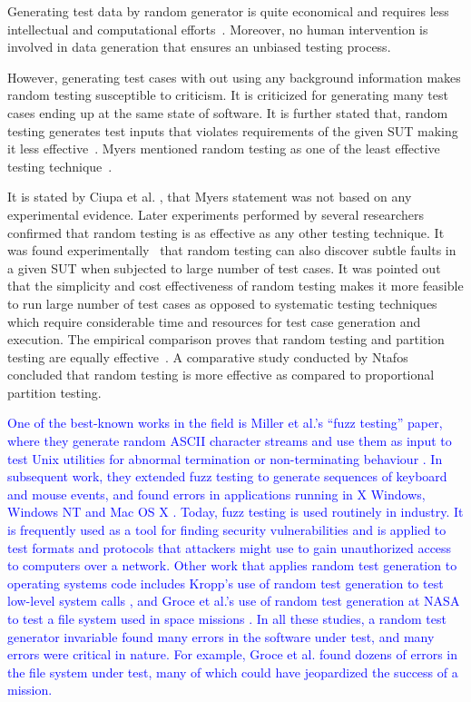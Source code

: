 Generating test data by random generator is quite economical and requires less intellectual and computational efforts~\cite{Ciupa2008a}. Moreover, no human intervention is involved in data generation that ensures an unbiased testing process.

However, generating test cases with out using any background information makes random testing susceptible to criticism. It is criticized for generating many test cases ending up at the same state of software. It is further stated that, random testing generates test inputs that violates requirements of the given SUT making it less effective~\cite{pacheco2009directed, sen2007effective}. Myers mentioned random testing as one of the least effective testing technique~\cite{Myers1979}.

It is stated by Ciupa et al. \cite{Ciupa2007}, that Myers statement was not based on any experimental evidence. Later experiments performed by several researchers~\cite{hamlet1994, Ciupa2008, leitner2007efficient, Duran1981} confirmed that random testing is as effective as any other testing technique. It was found experimentally~\cite{Duran1981} that random testing can also discover subtle faults in a given SUT when subjected to large number of test cases. It was pointed out that the simplicity and cost effectiveness of random testing makes it more feasible to run large number of test cases as opposed to systematic testing techniques which require considerable time and resources for test case generation and execution. The empirical comparison proves that random testing and partition testing are equally effective~\cite{hamlet1990}. A comparative study conducted by Ntafos~\cite{ntafos1998random} concluded that random testing is more effective as compared to proportional partition testing.

\textcolor{blue}{One of the best-known works in the field is Miller et al.’s “fuzz testing” paper, where they generate random ASCII character streams and use them as input to test Unix utilities for abnormal termination or non-terminating behaviour \cite{miller1990empirical}. In subsequent work, they extended fuzz testing to generate sequences of keyboard and mouse events, and found errors in applications running in X Windows, Windows NT and Mac OS X \cite{forrester2000empirical, miller2006empirical}. Today, fuzz testing is used routinely in industry. It is frequently used as a tool for finding security vulnerabilities and is applied to test formats and protocols that attackers might use to gain unauthorized access to computers over a network. Other work that applies random test generation to operating systems code includes Kropp’s use of random test generation to test low-level system calls \cite{kropp1998automated}, and Groce et al.’s use of random test generation at NASA to test a file system used in space missions \cite{groce2007randomized}. In all these studies, a random test generator invariable found many errors in the software under test, and many errors were critical in nature. For example, Groce et al. found dozens of errors in the file system under test, many of which could have jeopardized the success of a mission.}

